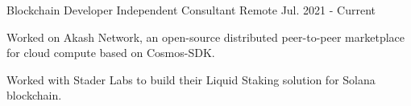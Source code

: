 

\begin{cventries}

    \cventry
    {Blockchain Developer} %
    {Independent Consultant} %
    {Remote} %
    {Jul. 2021 - Current} %
    {
        \begin{cvitems} %
            \item {Worked on Akash Network, an open-source distributed peer-to-peer marketplace for cloud compute based on Cosmos-SDK.}
            \item {Worked with Stader Labs to build their Liquid Staking solution for Solana blockchain.}
        \end{cvitems}
    }


\end{cventries}

